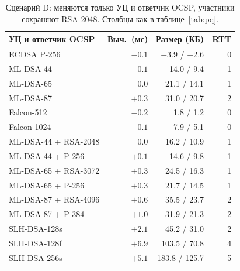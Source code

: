 \documentclass[conference,a4paper]{IEEEtran}
\newcommand{\newtext}[1]{{\color{blue}#1}}
\newcommand{\newgreen}[1]{{\color{green!50!black}#1}}
\newcommand{\newviolet}[1]{{\color{violet}#1}}
\begin{document}
{\begin{table}[!htb]
\centering\footnotesize
\setlength{\tabcolsep}{3.5pt}
\caption{\newtext{Сценарий D: меняются только УЦ и ответчик OCSP, участники сохраняют RSA-2048.
Столбцы как в таблице~\ref{tab:pq}.}}
\label{tab:pqD}
\color{blue}
\begin{tabular}{@{}lrrr@{}}
\toprule
УЦ и ответчик OCSP & Выч.\ (мс) & Размер (КБ) & RTT \\
\midrule
ECDSA P-256 & \newgreen{$-0.1$} & $-3.9$ / $-2.6$ & \newviolet{0} \\
ML-DSA-44 & \newgreen{$-0.1$} & 14.0 / 9.4 & 1 \\
ML-DSA-65 & \newgreen{0.0} & 21.1 / 14.1 & 1 \\
ML-DSA-87 & \newgreen{$+0.3$} & 31.0 / 20.7 & 2 \\
Falcon-512 & \newgreen{$-0.2$} & 1.8 / 1.2 & 0 \\
Falcon-1024 & \newgreen{$-0.1$} & 7.9 / 5.1 & 0 \\
ML-DSA-44 + RSA-2048 & \newgreen{0.0} & 16.2 / 10.9 & 1 \\
ML-DSA-44 + P-256 & \newgreen{$+0.1$} & 14.6 / 9.8 & 1 \\
ML-DSA-65 + RSA-3072 & \newgreen{$+0.3$} & 24.5 / 16.3 & 1 \\
ML-DSA-65 + P-256 & \newgreen{$+0.3$} & 21.7 / 14.5 & 1 \\
ML-DSA-87 + RSA-4096 & \newgreen{$+0.6$} & 35.5 / 23.7 & 2 \\
ML-DSA-87 + P-384 & \newgreen{$+1.0$} & 31.9 / 21.3 & 2 \\
SLH-DSA-128s & \newgreen{$+2.1$} & 45.2 / 31.0 & 2 \\
SLH-DSA-128f & \newgreen{$+6.9$} & 103.5 / 70.8 & 4 \\
SLH-DSA-256s & \newgreen{$+5.1$} & 183.8 / 125.7 & 5 \\
\bottomrule
\end{tabular}
\end{table}

}
\end{document}
